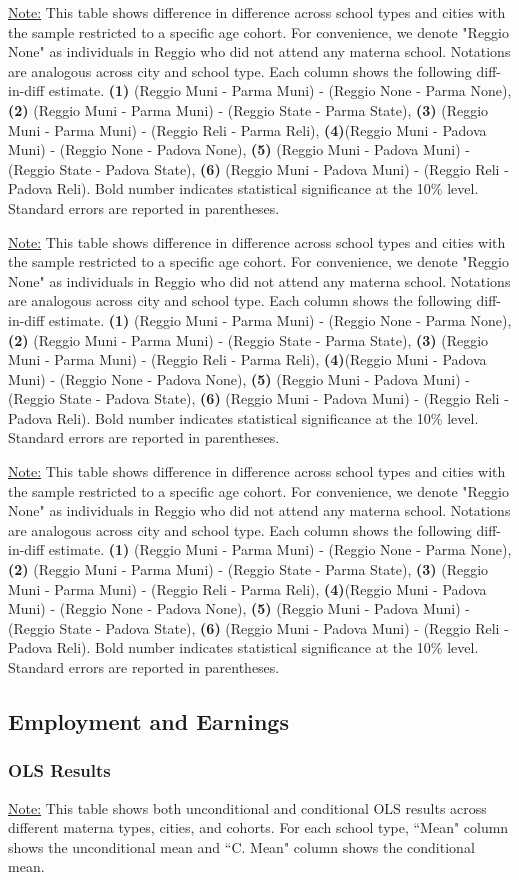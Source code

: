 \documentclass[11pt]{article}
\newcommand{\fnDID}{\underline{Note:} This table shows difference in difference across school types and cities with the sample restricted to a specific age cohort. For convenience, we denote "Reggio None" as individuals in Reggio who did not attend any materna school. Notations are analogous across city and school type. Each column shows the following diff-in-diff estimate. \textbf{(1)} (Reggio Muni - Parma Muni) - (Reggio None - Parma None), \textbf{(2)} (Reggio Muni - Parma Muni) - (Reggio State - Parma State), \textbf{(3)} (Reggio Muni - Parma Muni) - (Reggio Reli - Parma Reli), \textbf{(4)}(Reggio Muni - Padova Muni) - (Reggio None - Padova None),  \textbf{(5)}  (Reggio Muni - Padova Muni) - (Reggio State - Padova State), \textbf{(6)}  (Reggio Muni - Padova Muni) - (Reggio Reli - Padova Reli). Bold number indicates statistical significance at the 10\% level. Standard errors are reported in parentheses.}
\begin{document}
\begin{table}[H]
\begin{center}
	\caption{Difference-in-Difference Across School Types and Cities, Restricting to Age-30 Cohort} \label{table:ECh-30}
	\scalebox{0.80}{
		}
\end{center}
\footnotesize
\fnDID
\end{table}

\begin{table}[H]
\begin{center}
	\caption{Difference-in-Difference Across School Types and Cities, Restricting to Age-40 Cohort} \label{table:ECh-40}
	\scalebox{0.80}{
		}
\end{center}
\footnotesize
\fnDID
\end{table}

\begin{table}[H]
\begin{center}
	\caption{Difference-in-Difference Across School Types and Cities, Restricting to Age-50 Cohort} \label{table:ECh-50}
	\scalebox{0.80}{
		}
\end{center}
\footnotesize
\fnDID
\end{table}


\subsection{Employment and Earnings}
\subsubsection{OLS Results}
\begin{table}[H]
\begin{center}
	\caption{OLS Results} \label{table:OLS-W}
	\end{center}
	\footnotesize
\underline{Note:} This table shows both unconditional and conditional OLS results across different materna types, cities, and cohorts. For each school type, ``Mean" column shows the unconditional mean and ``C. Mean" column shows the conditional mean. 

\end{table}
\end{document}
